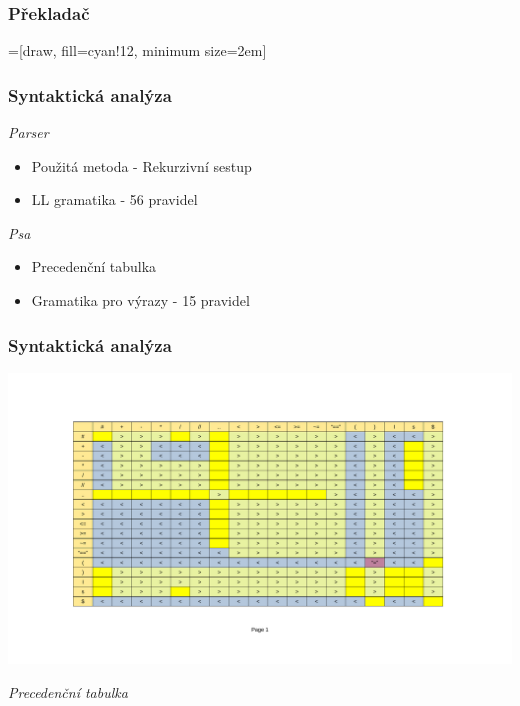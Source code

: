 

\begin{frame}
  \frametitle{Překladač}
  =[draw, fill=cyan!12, minimum size=2em]

\end{frame}


\begin{frame}
  \frametitle{Syntaktická analýza}
    \emph{Parser}
    \begin{itemize}
        \item Použitá metoda - Rekurzivní sestup
        \item LL gramatika - 56 pravidel
    \end{itemize}
    \emph{Psa}
    \begin{itemize}
        \item Precedenční tabulka
        \item Gramatika pro výrazy - 15 pravidel
    \end{itemize}
\end{frame}


\begin{frame}
  \frametitle{Syntaktická analýza}
    \includegraphics[width=\textwidth, trim={0 2.5cm 0 0},clip]{img/precedence_table.pdf}
    \begin{center}
        \textit{\emph{Precedenční tabulka}}
    \end{center}
\end{frame}

